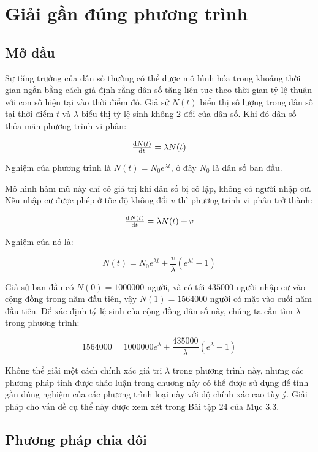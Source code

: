 \documentclass[../../Lectures.tex]{subfiles}
\begin{document}
\chapter{Giải gần đúng phương trình}

\section{Mở đầu}

Sự tăng trưởng của dân số thường có thể được mô hình hóa trong khoảng thời gian
ngắn bằng cách giả định rằng dân số tăng liên tục theo thời gian tỷ lệ thuận với
con số hiện tại vào thời điểm đó. Giả sử \(N(t)\) biểu thị số lượng trong dân số
tại thời điểm \(t\) và \(\lambda\) biểu thị tỷ lệ sinh không 2 đổi của dân số.
Khi đó dân số thỏa mãn phương trình vi phân:

\[\od{N(t)}{t} = \lambda N(t)\]

Nghiệm của phương trình là \(N(t) = N_0 e^{\lambda t}\), ở đây \(N_0\) là dân số
ban đầu.


Mô hình hàm mũ này chỉ có giá trị khi dân số bị cô lập, không có người nhập cư.
Nếu nhập cư được phép ở tốc độ không đổi \(v\) thì phương trình vi phân trở
thành:

\[\od{N(t)}{t} = \lambda N(t) + v\]

Nghiệm của nó là:

\[N(t) = N_0 e^{\lambda t} + \frac{v}{\lambda} (e^{\lambda t} - 1)\]

Giả sử ban đầu có \(N(0) = \num{1000000}\) người, và có tới \(\num{435000}\)
người nhập cư vào cộng đồng trong năm đầu tiên, vậy \(N(1) = \num{1564000}\)
người có mặt vào cuối năm đầu tiên. Để xác định tỷ lệ sinh của cộng đồng dân số
này, chúng ta cần tìm \(\lambda\) trong phương trình:

\[\num{1564000} = \num{1000000} e^\lambda + \frac{\num{435000}}{\lambda} (e^\lambda - 1)\]

Không thể giải một cách chính xác giá trị \(\lambda\) trong phương trình này,
nhưng các phương pháp tính được thảo luận trong chương này có thể được sử dụng
để tính gần đúng nghiệm của các phương trình loại này với độ chính xác cao tùy
ý. Giải pháp cho vấn đề cụ thể này được xem xét trong Bài tập 24 của Mục 3.3.

\section{Phương pháp chia đôi}
\end{document}
